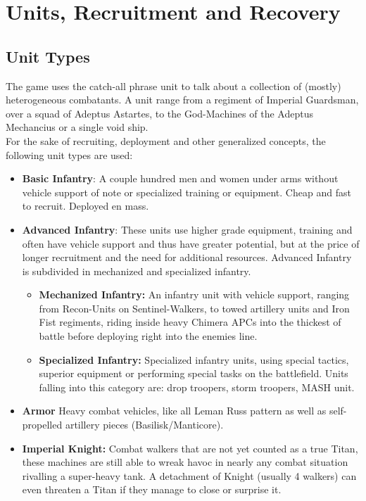 
\section{Units, Recruitment and Recovery} 
\subsection{Unit Types}
The game uses the catch-all phrase unit to talk about a collection of (mostly) heterogeneous combatants. A unit range from a regiment of Imperial Guardsman, over a squad of Adeptus Astartes, to the God-Machines of the Adeptus Mechancius or a single void ship.\\
For the sake of recruiting, deployment and other generalized concepts, the following unit types are used:
\begin{itemize}
    \item \textbf{Basic Infantry}: A couple hundred men and women under arms without vehicle support of note or specialized training or equipment. Cheap and fast to recruit. Deployed en mass.
    \item \textbf{Advanced Infantry}: These units use higher grade equipment, training and often have vehicle support and thus have greater potential, but at the price of longer recruitment and the need for additional resources. Advanced Infantry is subdivided in mechanized and specialized infantry.
    \begin{itemize}
    \item \textbf{Mechanized Infantry:} An infantry unit with vehicle support, ranging from Recon-Units on Sentinel-Walkers, to towed artillery units and Iron Fist regiments, riding inside heavy Chimera APCs into the thickest of battle before deploying right into the enemies line.
    \item \textbf{Specialized Infantry:} Specialized infantry units, using special tactics, superior equipment or performing special tasks on the battlefield. Units falling into this category are: drop troopers, storm troopers, MASH unit.
    \end{itemize}
    \item \textbf{Armor} Heavy combat vehicles, like all Leman Russ pattern as well as self-propelled artillery pieces (Basilisk/Manticore).
    \item \textbf{Imperial Knight:} Combat walkers that are not yet counted as a true Titan, these machines are still able to wreak havoc in nearly any combat situation rivalling a super-heavy tank. A detachment of Knight (usually 4 walkers) can even threaten a Titan if they manage to close or surprise it.

\end{itemize}
